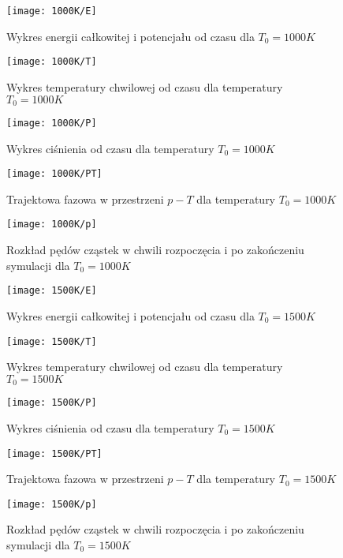 \documentclass[a4paper,10pt]{article}
\begin{document}
	    \begin{figure}[h]
		    \centering
		    \texttt{[image: 1000K/E]}
		    \caption{Wykres energii całkowitej i potencjału od czasu dla $T_0 = 1000 K$}
		    \label{1000ke}
	    \end{figure}
	    \begin{figure}[h]
		    \centering
		    \texttt{[image: 1000K/T]}
		    \caption{Wykres temperatury chwilowej od czasu dla temperatury $T_0 = 1000 K$}
		    \label{1000kt}
	    \end{figure}
	    \begin{figure}[h]
		    \centering
		    \texttt{[image: 1000K/P]}
		    \caption{Wykres ciśnienia od czasu dla temperatury $T_0 = 1000 K$}
		    \label{1000kp}
	    \end{figure}
	    \begin{figure}[h]
		    \centering
		    \texttt{[image: 1000K/PT]}
		    \caption{Trajektowa fazowa w przestrzeni $p-T$ dla temperatury $T_0 = 1000 K$}
		    \label{1000kpt}
	    \end{figure}
	    \begin{figure}[h]
		    \centering
		    \texttt{[image: 1000K/p]}
		    \caption{Rozkład pędów cząstek w chwili rozpoczęcia i po zakończeniu symulacji dla $T_0 = 1000 K$}
		    \label{1000kpp}
	    \end{figure}

	    \begin{figure}[h]
		    \centering
		    \texttt{[image: 1500K/E]}
		    \caption{Wykres energii całkowitej i potencjału od czasu dla $T_0 = 1500 K$}
		    \label{1500ke}
	    \end{figure}
	    \begin{figure}[h]
		    \centering
		    \texttt{[image: 1500K/T]}
		    \caption{Wykres temperatury chwilowej od czasu dla temperatury $T_0 = 1500 K$}
		    \label{1500kt}
	    \end{figure}
	    \begin{figure}[h]
		    \centering
		    \texttt{[image: 1500K/P]}
		    \caption{Wykres ciśnienia od czasu dla temperatury $T_0 = 1500 K$}
		    \label{1500kp}
	    \end{figure}
	    \begin{figure}[h]
		    \centering
		    \texttt{[image: 1500K/PT]}
		    \caption{Trajektowa fazowa w przestrzeni $p-T$ dla temperatury $T_0 = 1500 K$}
		    \label{1500kpt}
	    \end{figure}
	    \begin{figure}[h]
		    \centering
		    \texttt{[image: 1500K/p]}
		    \caption{Rozkład pędów cząstek w chwili rozpoczęcia i po zakończeniu symulacji dla $T_0 = 1500 K$}
		    \label{1500kpp}
	    \end{figure}			
\end{document}
